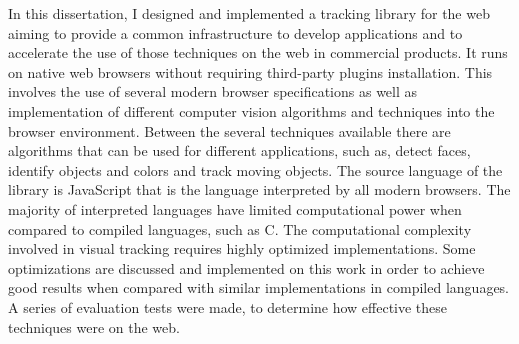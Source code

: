 In this dissertation, I designed and implemented a tracking library for the web aiming to provide a common infrastructure to develop applications and to accelerate the use of those techniques on the web in commercial products. It runs on native web browsers without requiring third-party plugins installation. This involves the use of several modern browser specifications as well as implementation of different computer vision algorithms and techniques into the browser environment. Between the several techniques available there are algorithms that can be used for different applications, such as, detect faces, identify objects and colors and track moving objects. The source language of the library is JavaScript that is the language interpreted by all modern browsers. The majority of interpreted languages have limited computational power when compared to compiled languages, such as C. The computational complexity involved in visual tracking requires highly optimized implementations. Some optimizations are discussed and implemented on this work in order to achieve good results when compared with similar implementations in compiled languages. A series of evaluation tests were made, to determine how effective these techniques were on the web.


